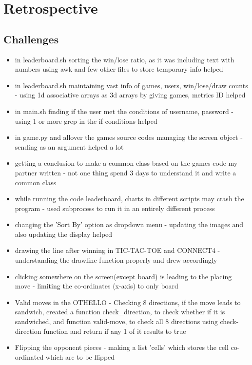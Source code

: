 \documentclass[12pt]{article}
\begin{document}
\section{Retrospective}

\subsection{Challenges}
\begin{itemize}
    \item in leaderboard.sh sorting the win/lose ratio, as it was including text with numbers using awk and few other files to store temporary info helped
    \item in leaderboard.sh maintaining vast info of games, users, win/lose/draw counts - using 1d associative arrays as 3d arrays by giving games, metrics ID helped
    \item in main.sh finding if the user met the conditions of username, password - using 1 or more grep in the if conditions helped
    \item in game.py and allover the games source codes managing the screen object - sending as an argument helped a lot
    \item getting a conclusion to make a common class based on the games code my partner written - not one thing spend 3 days to understand it and write a common class
    \item while running the code leaderboard, charts in different scripts may crash the program - used subprocess to run it in an entirely different process
    \item changing the 'Sort By' option as dropdown menu - updating the images and also updating the display helped
    \item drawing the line after winning in TIC-TAC-TOE and CONNECT4 - understanding the drawline function properly and drew accordingly
    \item clicking somewhere on the screen(except board) is leading to the placing move - limiting the co-ordinates (x-axis) to only board
    \item Valid moves in the OTHELLO - Checking 8 directions, if the move leads to sandwich, created a function check\_direction, to check whether if it is sandwiched, and function valid-move, to check all 8 directions using check-direction function and return if any 1 of it results to true
    \item Flipping the opponent pieces - making a list 'cells' which stores the cell co-ordinated which are to be flipped
\end{itemize}
\end{document}
